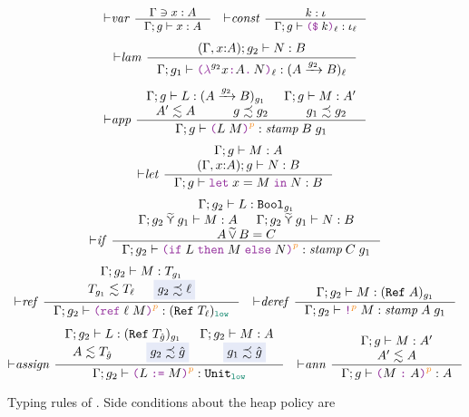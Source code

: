 \begin{figure}[tbp]
\raggedright
  \begin{gather*}
  \small
    {\vdash}\mathit{var}~
    \inference{\Gamma \ni x : A}
              {\Gamma; g \vdash x : A}
    \quad
    {\vdash}\mathit{const}~
    \inference{k : \iota}
              {\Gamma; g \vdash \const{k}{\ell} : \iota_\ell}
    \\[1ex]
    {\vdash}\mathit{lam}~
    \inference{(\Gamma , x{:}A); g_2 \vdash N : B}
              {\Gamma; g_1 \vdash \lam{g_2}{x}{A}{N}{\ell} : (\Fun{A}{g_2}{B})_\ell}
    \\[1ex]
    {\vdash}\mathit{app}~
    \inference{\Gamma; g \vdash L : (\Fun{A}{g_2}{B})_{g_1} &
               \Gamma; g \vdash M : A' \\
               A' \lesssim A & g \precsim g_2 & g_1 \precsim g_2}
              {\Gamma; g \vdash \app{L}{M}{p} : \textit{stamp}\;B\;g_1}
    \\[1ex]
    {\vdash}\mathit{let}~
    \inference{\Gamma; g \vdash M : A \\
               (\Gamma , x{:}A) ; g \vdash N : B}
              {\Gamma; g \vdash \letexp{x}{M}{N} : B}
    \\[1ex]
    {\vdash}\mathit{if}~
    \inference{\Gamma; g_2 \vdash L : \Bool_{g_1} \\
               \Gamma; g_2 \lconsisjoin g_1 \vdash M : A &
               \Gamma; g_2 \lconsisjoin g_1 \vdash N : B \\
               A \consisjoin B = C}
              {\Gamma; g_2 \vdash \ifexp{L}{M}{N}{p} : \textit{stamp}\;C\;g_1}
    \\[1ex]
    {\vdash}\mathit{ref}~
    \inference{\Gamma; g_2 \vdash M : T_{g_1} \\
               T_{g_1} \lesssim T_\ell & \highlightblue{g_2 \precsim \ell}}
              {\Gamma; g_2 \vdash \refexp{\ell}{M}{p} : (\Refer{T_\ell})_{\low}}
    \quad
    {\vdash}\mathit{deref}~
    \inference{\Gamma; g_2 \vdash M : (\Refer{A})_{g_1}}
              {\Gamma; g_2 \vdash \deref{M}{p} : \textit{stamp}\;A\;g_1}
    \\[1ex]
    {\vdash}\mathit{assign}~
    \inference{\Gamma; g_2 \vdash L : (\Refer{T_{\hat{g}}})_{g_1} &
               \Gamma; g_2 \vdash M : A \\
               A \lesssim T_{\hat{g}} & \highlightblue{g_2 \precsim \hat{g}} & \highlightblue{g_1 \precsim \hat{g}}}
              {\Gamma; g_2 \vdash \assign{L}{M}{p} : \Unit_{\low}}
    \quad
    {\vdash}\mathit{ann}~
    \inference{\Gamma; g \vdash M : A' \\ A' \lesssim A}
              {\Gamma; g \vdash \ann{M}{A}{p} : A}
  \end{gather*}
  \caption{Typing rules of \Surface. Side conditions about the heap policy are
    }
  \label{fig:surface-typing-full}
\end{figure}

